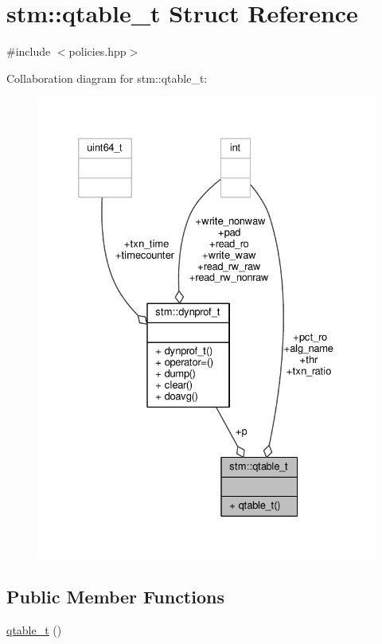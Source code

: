 \hypertarget{structstm_1_1qtable__t}{\section{stm\-:\-:qtable\-\_\-t Struct Reference}
\label{structstm_1_1qtable__t}
}


{\ttfamily \#include $<$policies.\-hpp$>$}



Collaboration diagram for stm\-:\-:qtable\-\_\-t\-:
\nopagebreak
\begin{figure}[H]
\begin{center}
\leavevmode
\includegraphics[width=328pt]{structstm_1_1qtable__t__coll__graph}
\end{center}
\end{figure}
\subsection*{Public Member Functions}
\begin{DoxyCompactItemize}
\item 
\hyperlink{structstm_1_1qtable__t_acc286af6b0bd3277f22d6eec1f54e0cd}{qtable\-\_\-t} ()
\end{DoxyCompactItemize}
